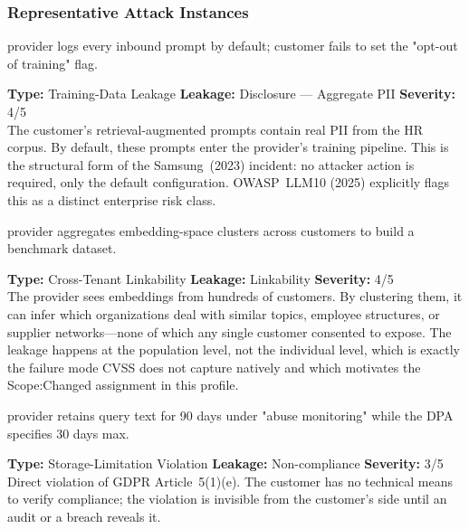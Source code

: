 \subsubsection{Representative Attack Instances}

\vspace{4pt}
\begin{attackbox}
  provider logs every inbound prompt by default;
        customer fails to set the "opt-out of training" flag.
\end{attackbox}
\begin{prosebox}
\small\textbf{Type:} Training-Data Leakage \quad
\textbf{Leakage:} Disclosure --- Aggregate PII \quad \textbf{Severity:} 4/5\\[2pt]
The customer's retrieval-augmented prompts contain real PII from the HR
corpus. By default, these prompts enter the provider's training pipeline.
This is the structural form of the Samsung~(2023) incident: no attacker
action is required, only the default configuration. OWASP~LLM10 (2025)
explicitly flags this as a distinct enterprise risk class.
\end{prosebox}

\vspace{4pt}
\begin{attackbox}
  provider aggregates embedding-space
        clusters across customers to build a benchmark dataset.
\end{attackbox}
\begin{prosebox}
\small\textbf{Type:} Cross-Tenant Linkability \quad
\textbf{Leakage:} Linkability \quad \textbf{Severity:} 4/5\\[2pt]
The provider sees embeddings from hundreds of customers. By clustering
them, it can infer which organizations deal with similar topics, employee
structures, or supplier networks---none of which any single customer
consented to expose. The leakage happens at the population level, not
the individual level, which is exactly the failure mode CVSS does not
capture natively and which motivates the Scope:Changed assignment
in this profile.
\end{prosebox}

\vspace{4pt}
\begin{attackbox}
  provider retains query text for 90 days
        under "abuse monitoring" while the DPA specifies 30 days max.
\end{attackbox}
\begin{prosebox}
\small\textbf{Type:} Storage-Limitation Violation \quad
\textbf{Leakage:} Non-compliance \quad \textbf{Severity:} 3/5\\[2pt]
Direct violation of GDPR Article~5(1)(e). The customer has no technical
means to verify compliance; the violation is invisible from the customer's
side until an audit or a breach reveals it.
\end{prosebox}

